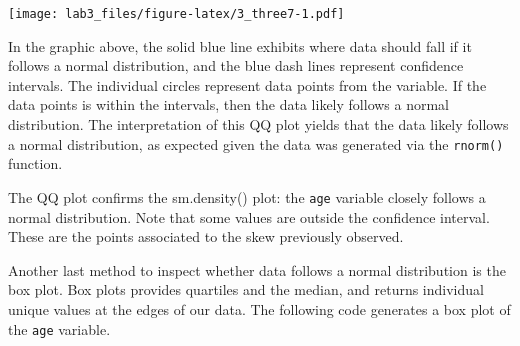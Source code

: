 \documentclass[]{article}
\newenvironment{Shaded}{\begin{snugshade}}{\end{snugshade}}
\newcommand{\KeywordTok}[1]{\textcolor[rgb]{0.13,0.29,0.53}{\textbf{#1}}}
\newcommand{\DataTypeTok}[1]{\textcolor[rgb]{0.13,0.29,0.53}{#1}}
\newcommand{\DecValTok}[1]{\textcolor[rgb]{0.00,0.00,0.81}{#1}}
\newcommand{\FloatTok}[1]{\textcolor[rgb]{0.00,0.00,0.81}{#1}}
\newcommand{\StringTok}[1]{\textcolor[rgb]{0.31,0.60,0.02}{#1}}
\newcommand{\CommentTok}[1]{\textcolor[rgb]{0.56,0.35,0.01}{\textit{#1}}}
\newcommand{\OperatorTok}[1]{\textcolor[rgb]{0.81,0.36,0.00}{\textbf{#1}}}
\newcommand{\NormalTok}[1]{#1}
\begin{document}
\begin{Shaded}
\end{Shaded}

\texttt{[image: lab3\_files/figure-latex/3\_three7-1.pdf]}

In the graphic above, the solid blue line exhibits where data should
fall if it follows a normal distribution, and the blue dash lines
represent confidence intervals. The individual circles represent data
points from the variable. If the data points is within the intervals,
then the data likely follows a normal distribution. The interpretation
of this QQ plot yields that the data likely follows a normal
distribution, as expected given the data was generated via the
\texttt{rnorm()} function.

The QQ plot confirms the sm.density() plot: the \texttt{age} variable
closely follows a normal distribution. Note that some values are outside
the confidence interval. These are the points associated to the skew
previously observed.

Another last method to inspect whether data follows a normal
distribution is the box plot. Box plots provides quartiles and the
median, and returns individual unique values at the edges of our data.
The following code generates a box plot of the \texttt{age} variable.
\end{document}
